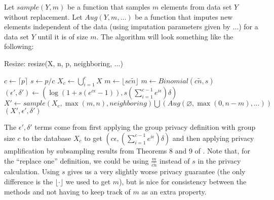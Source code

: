 \documentclass[11pt]{scrartcl} %
\begin{document}
Let $sample(Y, m)$ be a function that samples $m$ elements from data set $Y$ without replacement. 
Let $Aug(Y, m, \hdots)$ be a function that imputes new elements independent of the data (using imputation parameters given by $\hdots$) for a data set $Y$ until it is of size $m$. 
The algorithm will look something like the following:
\begin{algorithm}[H]
    \caption{Resize: resize(X, n, p, neighboring, ...)}
    \label{alg:gen_resize}
    \begin{algorithmic}[1]
        \State $c \gets \lceil p \rceil$ 
        \State $s \gets p/c$ 
        \State $X_c \gets \bigcup_{i=1}^{c}X$ 
            \State $m \gets \lfloor sc\tilde{n} \rfloor$ 
            \State $m \gets Binomial(c\tilde{n}, s)$ 
        \EndIf
        \State $(\epsilon', \delta') \gets \left(\log\left(1+s\left(e^{c\epsilon}-1\right) \right), s\left(\sum_{i=1}^{c-1}e^{i \epsilon}\right)\delta \right)$ 
        \State $X' \gets sample\left( X_c, \max(m, n), neighboring \right) \bigcup \left( Aug(\varnothing, \max(0, n - m), \hdots) \right)$
        \\ \Return $(X', \epsilon', \delta')$
    \end{algorithmic}
\end{algorithm}

The $\epsilon', \delta'$ terms come from first applying the group privacy definition with group size $c$ to the 
database $X_c$ to get $\left(c\epsilon, \left(\sum_{i=1}^{c-1}e^{i \epsilon}\right)\delta \right)$ \cite{Vad17}
and then applying privacy amplification by subsampling results from Theorems 8 and 9 of \cite{BBG18}. 
Note that, for the ``replace one'' definition, we could be using $\frac{m}{c\tilde{n}}$ instead of $s$ in the privacy calculation. Using $s$ gives us a very slightly 
worse privacy guarantee (the only difference is the $\lfloor \cdot \rfloor$ we used to get $m$), but is nice for 
consistency between the methods and not having to keep track of $m$ as an extra property.
\end{document}
